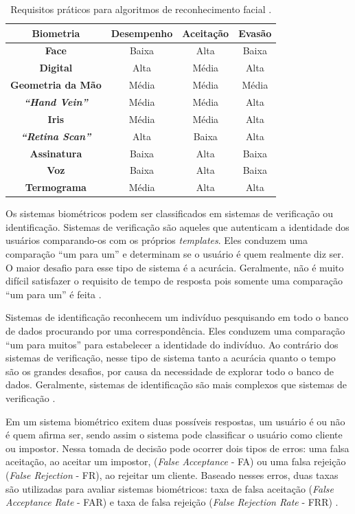 	\begin{table}[htb]
		\begin{center}
			\caption{Requisitos práticos para algoritmos de reconhecimento facial \cite{milene}.}
			\begin{tabular}{|c|c|c|c|}
				\hline \bf Biometria & \bf Desempenho & \bf Aceitação & \bf Evasão \\
				\hline \hline \bf Face & Baixa & Alta & Baixa\\
				\hline \bf Digital & Alta & Média &  Alta\\
				\hline \bf Geometria da Mão & Média & Média & Média\\
				\hline \bf \textit{``Hand Vein''} & Média & Média & Alta\\
				\hline \bf Iris  & Média & Média & Alta\\
				\hline \bf \textit{``Retina Scan''} & Alta & Baixa & Alta\\
				\hline \bf Assinatura & Baixa & Alta & Baixa \\
				\hline \bf Voz & Baixa & Alta & Baixa \\
				\hline \bf Termograma & Média & Alta & Alta \\
				\hline
			\end{tabular}
		\end{center}
		\label{tabelaRequisitosPraticos}
	\end{table}

Os sistemas biométricos podem ser classificados em sistemas de verificação ou identificação. Sistemas de verificação são aqueles que autenticam a identidade dos usuários comparando-os com os próprios \textit{templates}. Eles conduzem uma comparação ``um para um'' e determinam se o usuário é quem realmente diz ser. O maior desafio para esse tipo de sistema é a acurácia. Geralmente, não é muito difícil satisfazer o requisito de tempo de resposta pois somente uma comparação ``um para um'' é feita \cite{hong}.

Sistemas de identificação reconhecem um indivíduo pesquisando em todo o banco de dados procurando por uma correspondência. Eles conduzem uma comparação ``um para muitos'' para estabelecer a identidade do indivíduo. Ao contrário dos sistemas de verificação, nesse tipo de sistema tanto a acurácia quanto o tempo são os grandes desafios, por causa da necessidade de explorar todo o banco de dados. Geralmente, sistemas de identificação são mais complexos que sistemas de verificação \cite{hong}.

Em um sistema biométrico exitem duas possíveis respostas, um usuário é ou não é quem afirma ser, sendo assim o sistema pode classificar o usuário como cliente ou impostor. Nessa tomada de decisão pode ocorrer dois tipos de erros: uma falsa aceitação, ao aceitar um impostor, (\textit{False Acceptance} - FA) ou uma falsa rejeição (\textit{False Rejection} - FR), ao rejeitar um cliente. Baseado nesses erros, duas taxas são utilizadas para avaliar sistemas biométricos: taxa de falsa aceitação (\textit{False Acceptance Rate} - FAR) e taxa de falsa rejeição (\textit{False Rejection Rate} - FRR) \cite{drovetto}.

